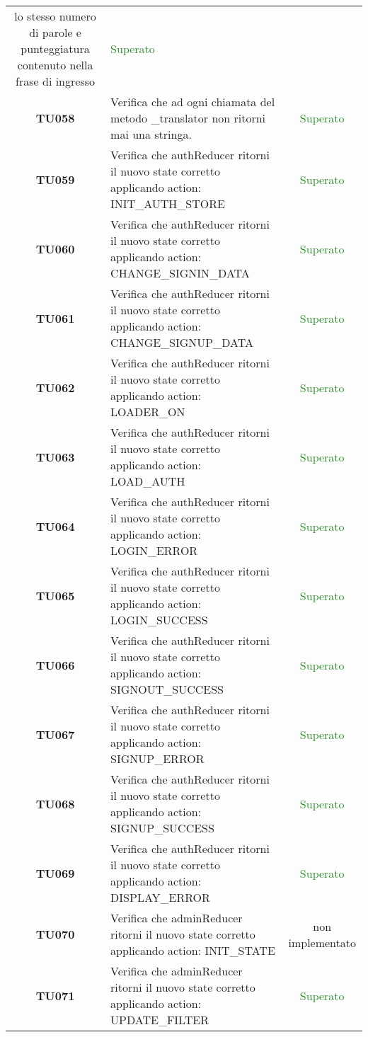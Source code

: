 \begin{tabularx}{\textwidth}{cXc}
	lo stesso numero di parole e punteggiatura contenuto nella frase di ingresso  & \textcolor{ForestGreen}{Superato} \\
	\textbf{TU058} & Verifica che ad ogni chiamata del metodo \_translator non ritorni mai una stringa. & \textcolor{ForestGreen}{Superato} \\
	\textbf{TU059} & Verifica che authReducer ritorni il nuovo state corretto applicando action: INIT\_AUTH\_STORE & \textcolor{ForestGreen}{Superato} \\
	\textbf{TU060} & Verifica che authReducer ritorni il nuovo state corretto applicando action: CHANGE\_SIGNIN\_DATA & \textcolor{ForestGreen}{Superato} \\
	\textbf{TU061} & Verifica che authReducer ritorni il nuovo state corretto applicando action: CHANGE\_SIGNUP\_DATA & \textcolor{ForestGreen}{Superato} \\
	\textbf{TU062} & Verifica che authReducer ritorni il nuovo state corretto applicando action: LOADER\_ON & \textcolor{ForestGreen}{Superato} \\
	\textbf{TU063} & Verifica che authReducer ritorni il nuovo state corretto applicando action: LOAD\_AUTH & \textcolor{ForestGreen}{Superato} \\
	\textbf{TU064} & Verifica che authReducer ritorni il nuovo state corretto applicando action: LOGIN\_ERROR & \textcolor{ForestGreen}{Superato} \\
	\textbf{TU065} & Verifica che authReducer ritorni il nuovo state corretto applicando action: LOGIN\_SUCCESS & \textcolor{ForestGreen}{Superato} \\
	\textbf{TU066} & Verifica che authReducer ritorni il nuovo state corretto applicando action: SIGNOUT\_SUCCESS & \textcolor{ForestGreen}{Superato} \\
	\textbf{TU067} & Verifica che authReducer ritorni il nuovo state corretto applicando action: SIGNUP\_ERROR & \textcolor{ForestGreen}{Superato} \\
	\textbf{TU068} & Verifica che authReducer ritorni il nuovo state corretto applicando action: SIGNUP\_SUCCESS & \textcolor{ForestGreen}{Superato} \\
	\textbf{TU069} & Verifica che authReducer ritorni il nuovo state corretto applicando action: DISPLAY\_ERROR & \textcolor{ForestGreen}{Superato} \\
	\textbf{TU070} & Verifica che adminReducer ritorni il nuovo state corretto applicando action: INIT\_STATE & non implementato \\
	\textbf{TU071} & Verifica che adminReducer ritorni il nuovo state corretto applicando action: UPDATE\_FILTER & \textcolor{ForestGreen}{Superato} \\

\end{tabularx}
